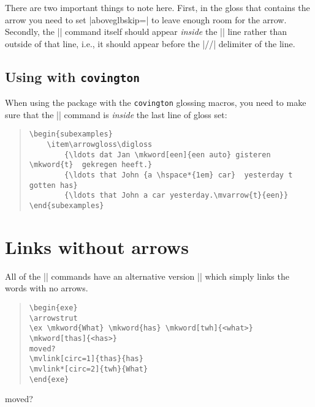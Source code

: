 \documentclass[11pt]{article}
\newcommand*{\pkg}[1]{\texttt{#1}}
\begin{document}
{There are two important things to note here. First, in the gloss that contains the arrow you need to set  |aboveglbskip=\glarrowheight| to leave enough room for the arrow. Secondly, the |\mvarrow| command itself should appear \emph{inside} the |\glft| line rather than outside of that line, i.e., it should appear before the |//| delimiter of the line.
\subsection{Using with \pkg{covington}}
When using the package with the \pkg{covington} glossing macros, you need to make sure that the |\mvarrow| command is \emph{inside} the last line of gloss set:

\begin{quote}
\begin{lstlisting}
\begin{subexamples}
	\item\arrowgloss\digloss
	    {\ldots dat Jan \mkword[een]{een auto} gisteren \mkword{t}  gekregen heeft.}
	    {\ldots that John {a \hspace*{1em} car}  yesterday t gotten has}
	    {\ldots that John a car yesterday.\mvarrow{t}{een}}	    
\end{subexamples}
\end{lstlisting}
\end{quote}

\section{Links without arrows}
All of the |\mvarrow| commands have an alternative version |\mvlink| which simply links the words with no arrows. 

\begin{quote}
\begin{lstlisting}
\begin{exe}
\arrowstrut
\ex \mkword{What} \mkword{has} \mkword[twh]{<what>} \mkword[thas]{<has>}
moved? 
\mvlink[circ=1]{thas}{has} 
\mvlink*[circ=2]{twh}{What}
\end{exe}
\end{lstlisting}
\end{quote}

\begin{exe}
\arrowstrut
\ex {}   
moved? 
\end{exe}



}
\end{document}
